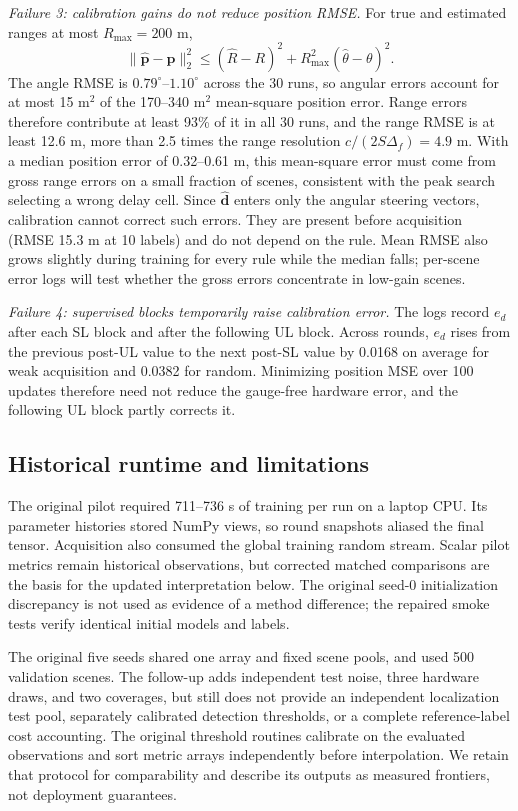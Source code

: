 \documentclass[conference]{IEEEtran}
\begin{document}
\emph{Failure 3: calibration gains do not reduce position RMSE.} For true and estimated ranges at most $R_{\max}=200$ m,
\begin{equation}
 \|\widehat{\mathbf p}-\mathbf p\|_2^2\le(\widehat R-R)^2+R_{\max}^2(\widehat\theta-\theta)^2.
\end{equation}
The angle RMSE is $0.79^\circ$--$1.10^\circ$ across the 30 runs, so angular errors account for at most 15 m$^2$ of the 170--340 m$^2$ mean-square position error. Range errors therefore contribute at least 93\% of it in all 30 runs, and the range RMSE is at least 12.6 m, more than 2.5 times the range resolution $c/(2S\Delta_f)=4.9$ m. With a median position error of 0.32--0.61 m, this mean-square error must come from gross range errors on a small fraction of scenes, consistent with the peak search selecting a wrong delay cell. Since $\widehat{\mathbf d}$ enters only the angular steering vectors, calibration cannot correct such errors. They are present before acquisition (RMSE 15.3 m at 10 labels) and do not depend on the rule. Mean RMSE also grows slightly during training for every rule while the median falls; per-scene error logs will test whether the gross errors concentrate in low-gain scenes.

\emph{Failure 4: supervised blocks temporarily raise calibration error.} The logs record $e_d$ after each SL block and after the following UL block. Across rounds, $e_d$ rises from the previous post-UL value to the next post-SL value by 0.0168 on average for weak acquisition and 0.0382 for random. Minimizing position MSE over 100 updates therefore need not reduce the gauge-free hardware error, and the following UL block partly corrects it.

\subsection{Historical runtime and limitations}
The original pilot required 711--736 s of training per run on a laptop CPU. Its parameter histories stored NumPy views, so round snapshots aliased the final tensor. Acquisition also consumed the global training random stream. Scalar pilot metrics remain historical observations, but corrected matched comparisons are the basis for the updated interpretation below. The original seed-0 initialization discrepancy is not used as evidence of a method difference; the repaired smoke tests verify identical initial models and labels.

The original five seeds shared one array and fixed scene pools, and used 500 validation scenes. The follow-up adds independent test noise, three hardware draws, and two coverages, but still does not provide an independent localization test pool, separately calibrated detection thresholds, or a complete reference-label cost accounting. The original threshold routines calibrate on the evaluated observations and sort metric arrays independently before interpolation. We retain that protocol for comparability and describe its outputs as measured frontiers, not deployment guarantees.
\end{document}
